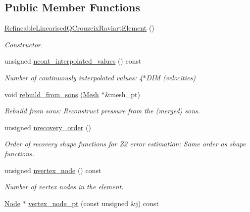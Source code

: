 \subsection*{Public Member Functions}
\begin{DoxyCompactItemize}
\item 
\hyperlink{classoomph_1_1RefineableLinearisedQCrouzeixRaviartElement_a2bc225f36b9b559fa4e6101914ed029a}{Refineable\+Linearised\+Q\+Crouzeix\+Raviart\+Element} ()
\begin{DoxyCompactList}\small\item\em Constructor. \end{DoxyCompactList}\item 
unsigned \hyperlink{classoomph_1_1RefineableLinearisedQCrouzeixRaviartElement_ad47315487ff8a24b4cb68a8ae9886091}{ncont\+\_\+interpolated\+\_\+values} () const
\begin{DoxyCompactList}\small\item\em Number of continuously interpolated values\+: 4$\ast$\+D\+IM (velocities) \end{DoxyCompactList}\item 
void \hyperlink{classoomph_1_1RefineableLinearisedQCrouzeixRaviartElement_a99ad7d880546a5df9cc502c7fbe9c24b}{rebuild\+\_\+from\+\_\+sons} (\hyperlink{classoomph_1_1Mesh}{Mesh} $\ast$\&mesh\+\_\+pt)
\begin{DoxyCompactList}\small\item\em Rebuild from sons\+: Reconstruct pressure from the (merged) sons. \end{DoxyCompactList}\item 
unsigned \hyperlink{classoomph_1_1RefineableLinearisedQCrouzeixRaviartElement_a1c1a77528956ab8a2ac0268511195efd}{nrecovery\+\_\+order} ()
\begin{DoxyCompactList}\small\item\em Order of recovery shape functions for Z2 error estimation\+: Same order as shape functions. \end{DoxyCompactList}\item 
unsigned \hyperlink{classoomph_1_1RefineableLinearisedQCrouzeixRaviartElement_a7da80a8d7a9ef0955afd4c8df649e40f}{nvertex\+\_\+node} () const
\begin{DoxyCompactList}\small\item\em Number of vertex nodes in the element. \end{DoxyCompactList}\item 
\hyperlink{classoomph_1_1Node}{Node} $\ast$ \hyperlink{classoomph_1_1RefineableLinearisedQCrouzeixRaviartElement_afa7b775f1f2a47c3c28fa61b77a34e4d}{vertex\+\_\+node\+\_\+pt} (const unsigned \&j) const

\end{DoxyCompactItemize}
